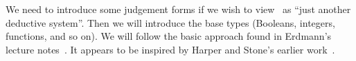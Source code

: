 \begin{node}\label{sml-0003}%
We need to introduce some judgement forms if we wish to view \SML\ as
``just another deductive system''. Then we will introduce the base types
(Booleans, integers, functions, and so on). We will follow the basic
approach found in Erdmann's lecture notes~\cite{erdmann2023evaluation}.
It appears to be inspired by Harper and Stone's earlier work~\cite{harper2000:smltt-final}.
\end{node}
